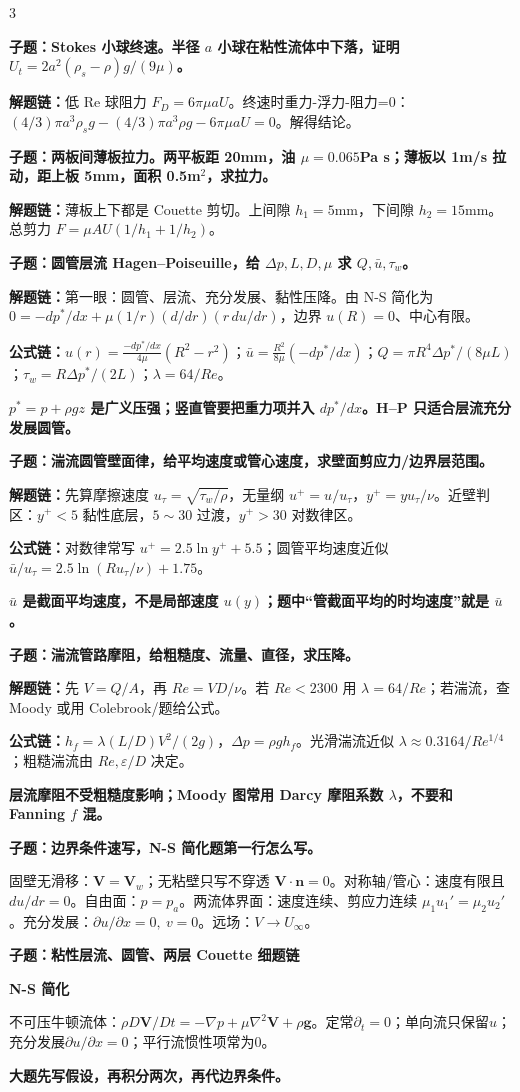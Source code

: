 \documentclass[a4paper]{article}
\newcommand{\qt}[1]{\vspace{0.25pt}\colorbox{Q}{\parbox{\dimexpr\linewidth-2\fboxsep}{\color{white}\bfseries #1}}\par}
\newcommand{\ans}[1]{\colorbox{G}{\parbox{\dimexpr\linewidth-2\fboxsep}{#1}}\par}
\newcommand{\warn}[1]{\colorbox{Y}{\parbox{\dimexpr\linewidth-2\fboxsep}{\color{E}\bfseries #1}}\par}
\newcommand{\chain}[1]{{\color{A}\bfseries 解题链：}#1\par}
\newcommand{\form}[1]{{\color{M}\bfseries 公式链：}#1\par}
\newcommand{\sect}[1]{\qt{#1}}
\newcommand{\schemeviscous}{}
\begin{document}
\begin{multicols}{3}
\qt{子题：Stokes 小球终速。半径 $a$ 小球在粘性流体中下落，证明 $U_t=2a^2(\rho_s-\rho)g/(9\mu)$。}
\chain{低 Re 球阻力 $F_D=6\pi\mu aU$。终速时重力-浮力-阻力=0：$(4/3)\pi a^3\rho_sg-(4/3)\pi a^3\rho g-6\pi\mu aU=0$。解得结论。}

\qt{子题：两板间薄板拉力。两平板距 20mm，油 $\mu=0.065$Pa s；薄板以 1m/s 拉动，距上板 5mm，面积 0.5m$^2$，求拉力。}
\chain{薄板上下都是 Couette 剪切。上间隙 $h_1=5$mm，下间隙 $h_2=15$mm。总剪力 $F=\mu AU(1/h_1+1/h_2)$。}

\qt{子题：圆管层流 Hagen--Poiseuille，给 $\Delta p,L,D,\mu$ 求 $Q,\bar u,\tau_w$。}
\chain{第一眼：圆管、层流、充分发展、黏性压降。由 N-S 简化为 $0=-dp^*/dx+\mu(1/r)(d/dr)(r\,du/dr)$，边界 $u(R)=0$、中心有限。}
\form{$u(r)=\frac{-dp^*/dx}{4\mu}(R^2-r^2)$；$\bar u=\frac{R^2}{8\mu}(-dp^*/dx)$；$Q=\pi R^4\Delta p^*/(8\mu L)$；$\tau_w=R\Delta p^*/(2L)$；$\lambda=64/Re$。}
\warn{$p^*=p+\rho gz$ 是广义压强；竖直管要把重力项并入 $dp^*/dx$。H--P 只适合层流充分发展圆管。}

\qt{子题：湍流圆管壁面律，给平均速度或管心速度，求壁面剪应力/边界层范围。}
\chain{先算摩擦速度 $u_\tau=\sqrt{\tau_w/\rho}$，无量纲 $u^+=u/u_\tau$，$y^+=yu_\tau/\nu$。近壁判区：$y^+<5$ 黏性底层，$5\sim30$ 过渡，$y^+>30$ 对数律区。}
\form{对数律常写 $u^+=2.5\ln y^+ +5.5$；圆管平均速度近似 $\bar u/u_\tau=2.5\ln(Ru_\tau/\nu)+1.75$。}
\warn{$\bar u$ 是截面平均速度，不是局部速度 $u(y)$；题中“管截面平均的时均速度”就是 $\bar u$。}

\qt{子题：湍流管路摩阻，给粗糙度、流量、直径，求压降。}
\chain{先 $V=Q/A$，再 $Re=VD/\nu$。若 $Re<2300$ 用 $\lambda=64/Re$；若湍流，查 Moody 或用 Colebrook/题给公式。}
\form{$h_f=\lambda(L/D)V^2/(2g)$，$\Delta p=\rho gh_f$。光滑湍流近似 $\lambda\approx0.3164/Re^{1/4}$；粗糙湍流由 $Re,\varepsilon/D$ 决定。}
\warn{层流摩阻不受粗糙度影响；Moody 图常用 Darcy 摩阻系数 $\lambda$，不要和 Fanning $f$ 混。}

\qt{子题：边界条件速写，N-S 简化题第一行怎么写。}
\ans{固壁无滑移：$\bm V=\bm V_w$；无粘壁只写不穿透 $\bm V\cdot\bm n=0$。对称轴/管心：速度有限且 $du/dr=0$。自由面：$p=p_a$。两流体界面：速度连续、剪应力连续 $\mu_1u_1'=\mu_2u_2'$。充分发展：$\partial u/\partial x=0,\ v=0$。远场：$V\to U_\infty$。}


\qt{子题：粘性层流、圆管、两层 Couette 细题链}
{\fontsize{2.66}{2.82}\selectfont
\schemeviscous
\sect{N-S 简化}
不可压牛顿流体：$\rho D\bm V/Dt=-\nabla p+\mu\nabla^2\bm V+\rho\bm g$。定常$\partial_t=0$；单向流只保留$u$；充分发展$\partial u/\partial x=0$；平行流惯性项常为0。\\
\warn{大题先写假设，再积分两次，再代边界条件。}

}
\end{multicols}
\end{document}
